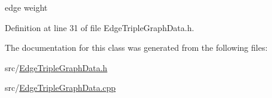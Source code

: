 edge weight 



Definition at line 31 of file Edge\-Triple\-Graph\-Data.\-h.



The documentation for this class was generated from the following files\-:\begin{DoxyCompactItemize}
\item 
src/\hyperlink{_edge_triple_graph_data_8h}{Edge\-Triple\-Graph\-Data.\-h}\item 
src/\hyperlink{_edge_triple_graph_data_8cpp}{Edge\-Triple\-Graph\-Data.\-cpp}\end{DoxyCompactItemize}
